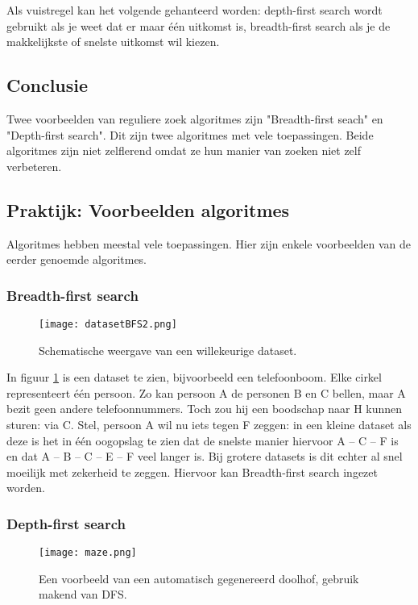 Als vuistregel kan het volgende gehanteerd worden: depth-first search wordt gebruikt als je weet dat er maar \'e\'en uitkomst is, breadth-first search als je de makkelijkste of snelste uitkomst wil kiezen.

\subsection{Conclusie}
Twee voorbeelden van reguliere zoek algoritmes zijn "Breadth-first seach" en  "Depth-first search". Dit zijn twee algoritmes met vele toepassingen. Beide algoritmes zijn niet zelflerend omdat ze hun manier van zoeken niet zelf verbeteren.
\newpage

\textcolor{praktijk}{
\subsection{Praktijk: Voorbeelden algoritmes}
}
Algoritmes hebben meestal vele toepassingen. Hier zijn enkele voorbeelden van de eerder genoemde algoritmes.

\subsubsection{Breadth-first search}
\begin{figure}[h]
  \centering
    \texttt{[image: datasetBFS2.png]}
  \caption{Schematische weergave van een willekeurige dataset.}
  \label{fig:datasetBFS2}
\end{figure}

In figuur \ref{fig:datasetBFS2} is een dataset te zien, bijvoorbeeld een telefoonboom. Elke cirkel representeert \'e\'en persoon. Zo kan persoon A de personen B en C bellen, maar A bezit geen andere telefoonnummers. Toch zou hij een boodschap naar H kunnen sturen: via C. 
Stel, persoon A wil nu iets tegen F zeggen: in een kleine dataset als deze is het in \'e\'en oogopslag te zien dat de snelste manier hiervoor A – C – F is en dat A – B – C – E – F veel langer is. Bij grotere datasets is dit echter al snel moeilijk met zekerheid te zeggen. Hiervoor kan Breadth-first search ingezet worden.

\subsubsection{Depth-first search}

\begin{figure}[H]
  \centering
    \texttt{[image: maze.png]}
  \caption{Een voorbeeld van een automatisch gegenereerd doolhof, gebruik makend van DFS.}
  \label{fig:maze}
\end{figure}

